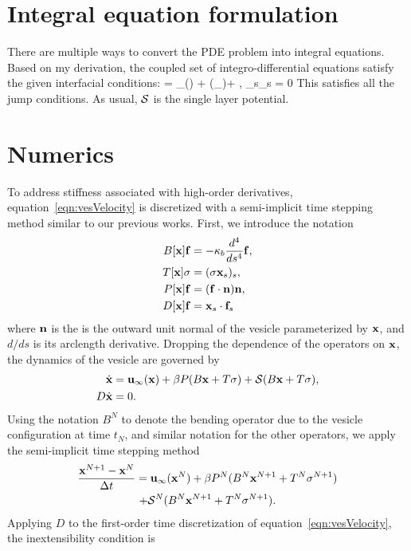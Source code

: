 \documentclass[aps,prl,showpacs]{revtex4}
\begin{document}
\section{Integral equation formulation}
There are multiple ways to convert the PDE problem into integral
equations. Based on my derivation, the coupled set of
integro-differential equations satisfy the given interfacial conditions:
\beq 
  \dot{\mbx} = \mbu_\infty(\mbx) + \beta (\mbf_\cdot\mbn)\mbn + , 
  \label{eqn:vesVelocity}
\eeq
\beq 
  \mbx_s\cdot\dot{\mbx}_s = 0 
\eeq
This satisfies all the jump conditions. As usual, $\mathcal{S}$ is the single layer potential. 

\section{Numerics}
To address stiffness associated with high-order derivatives,
equation~\eqref{eqn:vesVelocity} is discretized with a semi-implicit
time stepping method similar to our previous works.  First, we introduce
the notation
\begin{align}
  B[\mathbf{x}]\mathbf{f} &= -\kappa_b\frac{d^4}{ds^4} \mathbf{f}, \\
  T[\mathbf{x}]\sigma &= (\sigma \mathbf{x}_s)_s, \\
  P[\mathbf{x}]\mathbf{f} &= (\mathbf{f} \cdot \mathbf{n}) \mathbf{n}, \\
  D[\mathbf{x}]\mathbf{f} &= \mathbf{x}_s \cdot \mathbf{f}_s
\end{align}
where $\mathbf{n}$ is the is the outward unit normal of the vesicle
parameterized by $\mathbf{x}$, and $d/ds$ is its arclength derivative.
Dropping the dependence of the operators on $\mathbf{x}$, the dynamics of the
vesicle are governed by
\begin{align}
  \dot{\mathbf{x}} &= \mathbf{u}_{\infty}(\mathbf{x}) + 
  \beta P(B\mathbf{x} + T\sigma) + \mathcal{S}(B\mathbf{x} + T\sigma), \\
  D \dot{\mathbf{x}} &= 0.
\end{align}
Using the notation $B^N$ to denote the bending operator due to the
vesicle configuration at time $t_N$, and similar notation for the other
operators, we apply the semi-implicit time stepping method
\begin{multline}  
  \frac{\mathbf{x}^{N+1} - \mathbf{x}^N}{\Delta t} = \mathbf{u}_\infty(\mathbf{x}^N) 
  + \beta P^N(B^N\mathbf{x}^{N+1} + T^N\sigma^{N+1})  \\
  + \mathcal{S}^N(B^N\mathbf{x}^{N+1} + T^N\sigma^{N+1}).
\end{multline}
Applying $D$ to the first-order time discretization of
equation~\eqref{eqn:vesVelocity}, the inextensibility condition is
\end{document}
